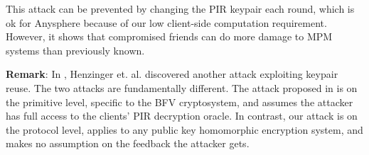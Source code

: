 This attack can be prevented by changing the PIR keypair each round, which is ok for Anysphere because of our low client-side computation requirement. However, it shows that compromised friends can do more damage to MPM systems than previously known.

\textbf{Remark}: In \cite{henry2022simplepir}, Henzinger et. al. discovered another attack exploiting keypair reuse. The two attacks are fundamentally different. The attack proposed in \cite{henry2022simplepir} is on the primitive level, specific to the BFV cryptosystem, and assumes the attacker has full access to the clients' PIR decryption oracle. In contrast, our attack is on the protocol level, applies to any public key homomorphic encryption system, and makes no assumption on the feedback the attacker gets.

